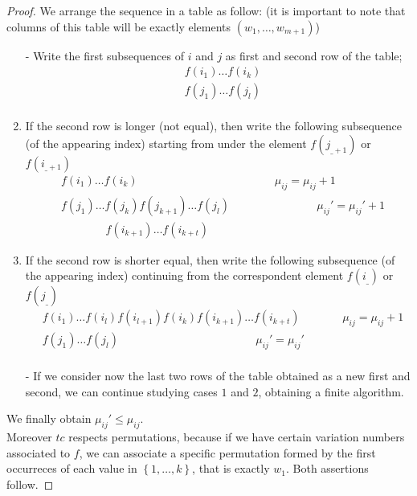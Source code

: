 \begin{proof}
We arrange the sequence in a table as follow: (it is important to note that columns of this table will be exactly elements $(w_{1},\dots, w_{m+1})$)
\begin{enumerate}
	\item [-] Write the first subsequences of $i$ and $j$ as first and second row of the table;
\begin{equation*}
\begin{split}
		&f(i_{1})\dots f(i_{k}) \\
		&f(j_{1})\dots f(j_{l}) \\
	\end{split}
\end{equation*}
	\item If the second row is longer (not equal), then write the following subsequence (of the appearing index) starting from under the element $f(j_{\_+1})$ or $f(i_{\_+1})$
\begin{equation*}
	\begin{split}
		&f(i_{1})\dots f(i_{k}) \ \ \ \ \ \ \ \ \ \ \ \ \ \ \ \ \ \ \ \ \ \ \ \ \ \ \ \ \ \ \ \ \ \ \ \ \ \ \ \ \ \ \ \ \ \ \ \ \ \ \ \ \ \ \  \mu_{ij}=\mu_{ij}+1\\
		&f(j_{1})\dots f(j_{k})f(j_{k+1})\dots f(j_{l})\ \ \ \ \ \ \ \ \ \ \ \ \ \ \ \ \ \ \ \ \ \ \ \ \ \ \ \ \ \ \ \ \ \ \ \mu_{ij}'=\mu_{ij}'+1 \\
		& \ \ \ \ \ \ \ \ \ \ \ \ \ \ \ \ \ \ f(i_{k+1})\dots f(i_{k+t})
	\end{split}
\end{equation*}
\item If the second row is shorter equal, then write the following subsequence (of the appearing index) continuing from the correspondent element $f(i_{\_})$ or $f(j_{\_})$
\begin{equation*}
	\begin{split}
		&f(i_{1})\dots f(i_{l})f(i_{l+1})f(i_{k})f(i_{k+1})\dots f(i_{k+t}) \ \ \ \ \ \ \ \ \ \ \ \ \ \ \ \ \ \mu_{ij}=\mu_{ij}+1\\
		&f(j_{1})\dots f(j_{l}) \ \ \ \ \ \ \ \ \ \ \ \ \ \ \ \ \ \ \ \ \ \ \ \ \ \ \ \ \ \ \ \ \ \ \ \ \ \ \ \ \ \ \ \ \ \ \ \ \ \ \ \ \ \ \  \mu_{ij}'=\mu_{ij}'\\
	\end{split}
\end{equation*}
\item [-] If we consider now the last two rows of the table obtained as a new first and second, we can continue studying cases $1$ and $2$, obtaining a finite algorithm.
\end{enumerate}
We finally obtain $\mu_{ij}'\le \mu_{ij}$.\\
Moreover $tc$ respects permutations, because if we have certain variation numbers associated to $f$, we can associate a specific permutation formed by the first occurreces of each value in $\left\lbrace 1,\dots, k \right\rbrace $, that is exactly $w_{1}$.
Both assertions follow.
\end{proof}

